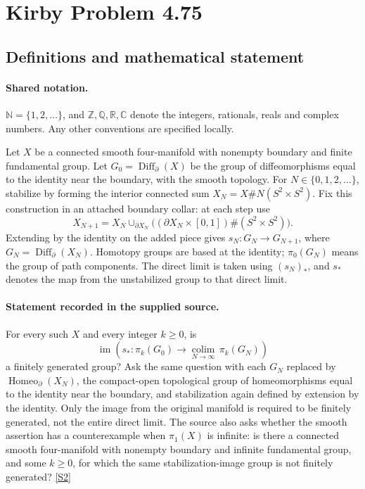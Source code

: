 \documentclass[11pt]{article}
\newcommand{\sref}[2]{\hyperlink{source:#1:#2}{[S#2]}}
\begin{document}
\section{Kirby Problem 4.75}\label{statement}

\subsection{Definitions and mathematical statement}

\paragraph{Shared notation.}$\mathbb N=\{1,2,\ldots\}$, and $\mathbb Z,\mathbb Q,\mathbb R,\mathbb C$ denote the integers, rationals, reals and complex numbers. Any other conventions are specified locally.


Let $X$ be a connected smooth four-manifold with nonempty boundary and finite fundamental group. Let $G_0=\operatorname{Diff}_{\partial}(X)$ be the group of diffeomorphisms equal to the identity near the boundary, with the smooth topology. For $N\in\{0,1,2,\ldots\}$, stabilize by forming the interior connected sum $X_N=X\#N(S^2\times S^2)$. Fix this construction in an attached boundary collar: at each step use
\[
X_{N+1}=X_N\cup_{\partial X_N}\bigl((\partial X_N\times[0,1])\#(S^2\times S^2)\bigr).
\]
Extending by the identity on the added piece gives $s_N:G_N\to G_{N+1}$, where $G_N=\operatorname{Diff}_{\partial}(X_N)$. Homotopy groups are based at the identity; $\pi_0(G_N)$ means the group of path components. The direct limit is taken using $(s_N)_*$, and $s_*$ denotes the map from the unstabilized group to that direct limit.
\paragraph{Statement recorded in the supplied source.}
For every such $X$ and every integer $k\ge0$, is
\[
\operatorname{im}\left(s_*:\pi_k(G_0)\longrightarrow\underset{N\to\infty}{\operatorname{colim}}\,\pi_k(G_N)\right)
\]
a finitely generated group? Ask the same question with each $G_N$ replaced by $\operatorname{Homeo}_{\partial}(X_N)$, the compact-open topological group of homeomorphisms equal to the identity near the boundary, and stabilization again defined by extension by the identity. Only the image from the original manifold is required to be finitely generated, not the entire direct limit. The source also asks whether the smooth assertion has a counterexample when $\pi_1(X)$ is infinite: is there a connected smooth four-manifold with nonempty boundary and infinite fundamental group, and some $k\ge0$, for which the same stabilization-image group is not finitely generated? \sref{statement}{2}
\end{document}
